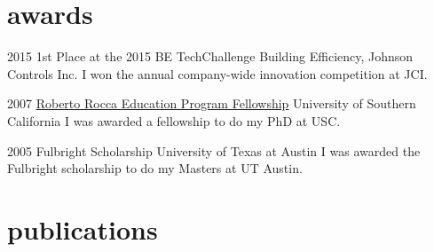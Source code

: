 \documentclass[]{../friggeri-cv} %
\begin{document}

\section{awards}

\begin{entrylist}


\entry
{2015}
{1st Place at the 2015 BE TechChallenge}
{Building Efficiency, Johnson Controls Inc.}
{I won the annual company-wide innovation competition at JCI.}

\entry
{2007}
{\href{http://www.robertorocca.org/en/fellowships/fellows07.aspx}{Roberto Rocca Education Program Fellowship}}
{University of Southern California}
{I was awarded a fellowship to do my PhD at USC.}

\entry
{2005}
{Fulbright Scholarship}
{University of Texas at Austin}
{I was awarded the Fulbright scholarship to do my Masters at UT Austin.}


\end{entrylist}





\section{publications}
\end{document}
